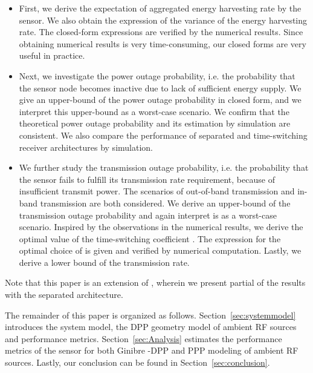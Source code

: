 \documentclass[12pt,draftclsnofoot,onecolumn]{IEEEtran}
\begin{document}
\begin{itemize}

\item First, we derive the expectation of aggregated energy harvesting rate by the sensor. We also obtain the expression of the variance of the energy harvesting rate. 
The closed-form expressions are verified by the numerical results. Since obtaining numerical results is very time-consuming, our closed forms are very useful in practice.



\item Next, we investigate the power outage probability, i.e. the probability that the sensor node becomes inactive due to lack of sufficient energy supply. We give an upper-bound of the power outage probability in closed form, and we interpret this upper-bound as a worst-case scenario. We confirm that the theoretical power outage probability and its estimation by simulation are consistent. We also compare the performance of separated and time-switching receiver architectures by simulation.

\item We further study the transmission outage probability, i.e. the probability that the sensor fails to fulfill its transmission rate requirement, because of insufficient transmit power. The scenarios of out-of-band transmission and in-band transmission are both considered. We derive an upper-bound of the transmission outage probability and again interpret is as a worst-case scenario. 
Inspired by the observations in the numerical results, we derive the optimal value of the time-switching coefficient . The expression for the optimal choice of  is given and verified by numerical computation. Lastly,
we derive a lower bound of the transmission rate.  

\end{itemize}

Note that this paper is an extension of \cite{ConfVersion}, wherein we present partial of the results with the separated architecture.





The remainder of this paper is organized as follows. Section~\ref{sec:systemmodel} introduces the system model, the DPP geometry model of ambient RF sources and performance metrics. Section~\ref{sec:Analysis} estimates the performance metrics of the sensor for both Ginibre -DPP and PPP modeling of ambient RF sources. 
Lastly, our conclusion can be found in Section~\ref{sec:conclusion}.
\end{document}
